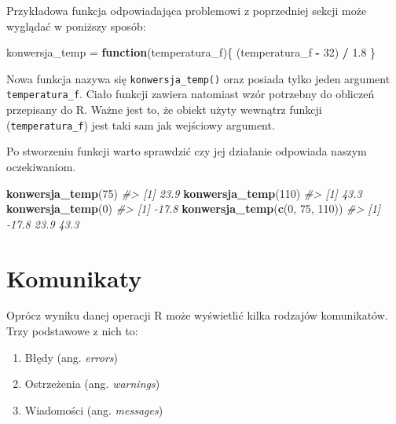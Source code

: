 \documentclass[paper=6in:9in,pagesize=pdftex,headinclude=on,footinclude=on,10pt]{scrbook}
\newenvironment{Shaded}{\begin{snugshade}}{\end{snugshade}}
\newcommand{\CommentTok}[1]{\textcolor[rgb]{0.56,0.35,0.01}{\textit{#1}}}
\newcommand{\ControlFlowTok}[1]{\textcolor[rgb]{0.13,0.29,0.53}{\textbf{#1}}}
\newcommand{\DecValTok}[1]{\textcolor[rgb]{0.00,0.00,0.81}{#1}}
\newcommand{\FloatTok}[1]{\textcolor[rgb]{0.00,0.00,0.81}{#1}}
\newcommand{\KeywordTok}[1]{\textcolor[rgb]{0.13,0.29,0.53}{\textbf{#1}}}
\newcommand{\NormalTok}[1]{#1}
\newcommand{\OperatorTok}[1]{\textcolor[rgb]{0.81,0.36,0.00}{\textbf{#1}}}
\newcommand{\StringTok}[1]{\textcolor[rgb]{0.31,0.60,0.02}{#1}}
\providecommand{\tightlist}{%
  \setlength{\itemsep}{0pt}\setlength{\parskip}{0pt}}
\begin{document}
Przykładowa funkcja odpowiadająca problemowi z poprzedniej sekcji może wyglądać w poniższy sposób:

\begin{Shaded}
\begin{Highlighting}[]
\NormalTok{konwersja_temp =}\StringTok{ }\ControlFlowTok{function}\NormalTok{(temperatura_f)\{}
\NormalTok{    (temperatura_f }\OperatorTok{-}\StringTok{ }\DecValTok{32}\NormalTok{) }\OperatorTok{/}\StringTok{ }\FloatTok{1.8}
\NormalTok{\}}
\end{Highlighting}
\end{Shaded}

Nowa funkcja nazywa się \texttt{konwersja\_temp()} oraz posiada tylko jeden argument \texttt{temperatura\_f}.
Ciało funkcji zawiera natomiast wzór potrzebny do obliczeń przepisany do R.
Ważne jest to, że obiekt użyty wewnątrz funkcji (\texttt{temperatura\_f}) jest taki sam jak wejściowy argument.

Po stworzeniu funkcji warto sprawdzić czy jej działanie odpowiada naszym oczekiwaniom.

\begin{Shaded}
\begin{Highlighting}[]
\KeywordTok{konwersja_temp}\NormalTok{(}\DecValTok{75}\NormalTok{)}
\CommentTok{#> [1] 23.9}
\KeywordTok{konwersja_temp}\NormalTok{(}\DecValTok{110}\NormalTok{)}
\CommentTok{#> [1] 43.3}
\KeywordTok{konwersja_temp}\NormalTok{(}\DecValTok{0}\NormalTok{)}
\CommentTok{#> [1] -17.8}
\KeywordTok{konwersja_temp}\NormalTok{(}\KeywordTok{c}\NormalTok{(}\DecValTok{0}\NormalTok{, }\DecValTok{75}\NormalTok{, }\DecValTok{110}\NormalTok{))}
\CommentTok{#> [1] -17.8  23.9  43.3}
\end{Highlighting}
\end{Shaded}

\hypertarget{komunikaty}{%
\section{Komunikaty}\label{komunikaty}}

Oprócz wyniku danej operacji R może wyświetlić kilka rodzajów komunikatów.
Trzy podstawowe z nich to:

\begin{enumerate}
\def\labelenumi{\arabic{enumi}.}
\tightlist
\item
  Błędy (ang. \emph{errors})
\item
  Ostrzeżenia (ang. \emph{warnings})
\item
  Wiadomości (ang. \emph{messages})
\end{enumerate}
\end{document}
